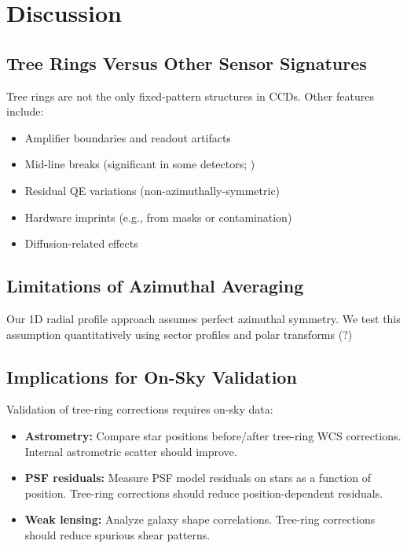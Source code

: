 \section{Discussion} \label{sec:discussion}

\subsection{Tree Rings Versus Other Sensor Signatures}

Tree rings are not the only fixed-pattern structures in \lsstcam{} CCDs. Other features include:

\begin{itemize}
\item Amplifier boundaries and readout artifacts
\item Mid-line breaks (significant in some detectors; \citealt{Esteves2023})
\item Residual QE variations (non-azimuthally-symmetric)
\item Hardware imprints (e.g., from masks or contamination)
\item Diffusion-related effects
\end{itemize}

\subsection{Limitations of Azimuthal Averaging}

Our 1D radial profile approach assumes perfect azimuthal symmetry. We test this assumption quantitatively using sector profiles and polar transforms (?)

\subsection{Implications for On-Sky Validation}

Validation of tree-ring corrections requires on-sky data:

\begin{itemize}
\item \textbf{Astrometry:} Compare star positions before/after tree-ring WCS corrections. Internal astrometric scatter should improve.
\item \textbf{PSF residuals:} Measure PSF model residuals on stars as a function of position. Tree-ring corrections should reduce position-dependent residuals.
\item \textbf{Weak lensing:} Analyze galaxy shape correlations. Tree-ring corrections should reduce spurious shear patterns.
\end{itemize}

